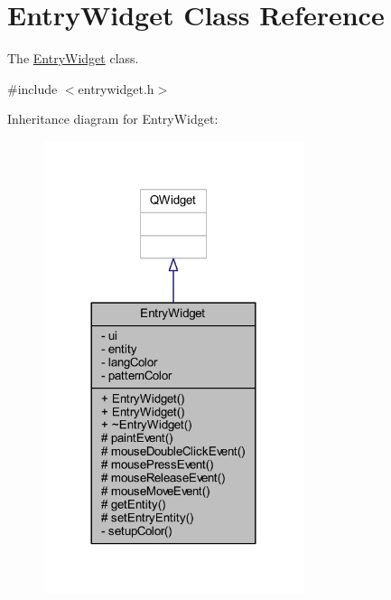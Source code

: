 \hypertarget{class_entry_widget}{\section{Entry\+Widget Class Reference}
\label{class_entry_widget}
}


The \hyperlink{class_entry_widget}{Entry\+Widget} class.  




{\ttfamily \#include $<$entrywidget.\+h$>$}



Inheritance diagram for Entry\+Widget\+:
\nopagebreak
\begin{figure}[H]
\begin{center}
\leavevmode
\includegraphics[width=216pt]{class_entry_widget__inherit__graph}
\end{center}
\end{figure}


